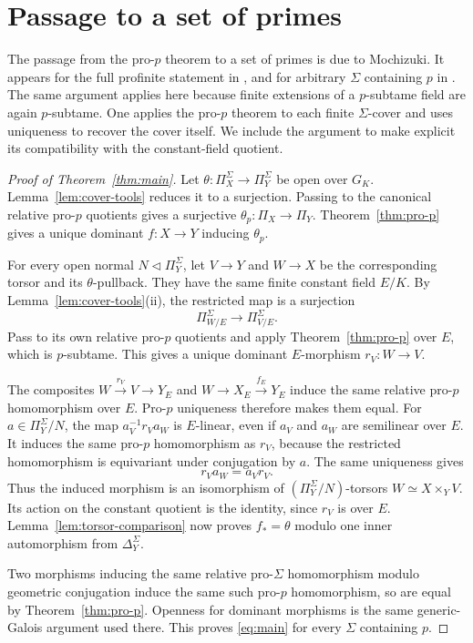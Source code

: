 \documentclass[11pt,a4paper]{article}
\numberwithin{equation}{section}
\theoremstyle{plain}
\theoremstyle{definition}
\theoremstyle{remark}
\begin{document}
\section{Passage to a set of primes}
\label{sec:sigma}

The passage from the pro-$p$ theorem to a set of primes is due to
Mochizuki. It appears for the full profinite statement in
\cite[Remark after Theorem~16.5]{Mochizuki1999}, and for arbitrary
$\Sigma$ containing $p$ in
\cite[Theorem~A and the following remark, p.~121]{Mochizuki2003}.
The same argument applies here because finite extensions of a
$p$-subtame field are again $p$-subtame. One applies the pro-$p$ theorem
to each finite $\Sigma$-cover and uses uniqueness to recover the cover
itself. We include the argument to make explicit its compatibility
with the constant-field quotient.

\begin{proof}[Proof of Theorem~\ref{thm:main}]
Let $\theta:\Pi_X^\Sigma\to\Pi_Y^\Sigma$ be open over $G_K$.
Lemma~\ref{lem:cover-tools} reduces it to a surjection. Passing to
the canonical relative pro-$p$ quotients gives a surjective
$\theta_p:\Pi_X\to\Pi_Y$. Theorem~\ref{thm:pro-p} gives a unique
dominant $f:X\to Y$ inducing $\theta_p$.

For every open normal $N\triangleleft\Pi_Y^\Sigma$, let $V\to Y$
and $W\to X$ be the corresponding torsor and its $\theta$-pullback.
They have the same
finite constant field $E/K$. By Lemma~\ref{lem:cover-tools}(ii), the
restricted map is a surjection
\[
                   \Pi_{W/E}^\Sigma\longrightarrow\Pi_{V/E}^\Sigma.
\]
Pass to its own relative pro-$p$ quotients and apply
Theorem~\ref{thm:pro-p} over $E$, which is $p$-subtame. This gives
a unique dominant $E$-morphism $r_V:W\to V$.

The composites $W\xrightarrow{r_V}V\to Y_E$ and
$W\to X_E\xrightarrow{f_E}Y_E$ induce the same relative pro-$p$
homomorphism over $E$. Pro-$p$ uniqueness therefore makes them equal.
For $a\in\Pi_Y^\Sigma/N$, the map $a_V^{-1}r_Va_W$ is $E$-linear, even if
$a_V$ and $a_W$ are semilinear over $E$. It induces the same pro-$p$
homomorphism as $r_V$, because the restricted homomorphism is
equivariant under conjugation by $a$. The same uniqueness gives
\[
                         r_Va_W=a_Vr_V.
\]
Thus the induced morphism is an isomorphism of $(\Pi_Y^\Sigma/N)$-torsors
$W\simeq X\times_YV$. Its action on the constant quotient is the
identity, since $r_V$ is over $E$. Lemma~\ref{lem:torsor-comparison}
now proves $f_*=\theta$ modulo one inner automorphism from
$\Delta_Y^\Sigma$.

Two morphisms inducing the same relative pro-$\Sigma$ homomorphism
modulo geometric conjugation induce the same such pro-$p$ homomorphism, so are
equal by Theorem~\ref{thm:pro-p}. Openness for dominant morphisms is
the same generic-Galois argument used there. This proves
\eqref{eq:main} for every $\Sigma$ containing $p$.
\end{proof}
\end{document}
